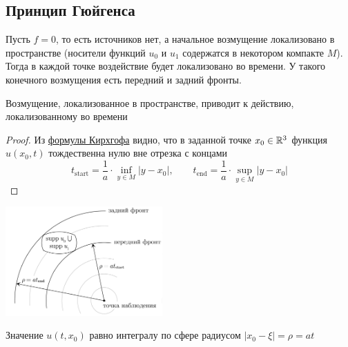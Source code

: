 \documentclass[../main.tex]{subfiles}
\begin{document}
\subsection{Принцип Гюйгенса}

Пусть $f=0$, то есть источников нет, а начальное возмущение локализовано в пространстве (носители функций $u_0$ и $u_1$ содержатся в некотором компакте $M$). Тогда в каждой точке воздействие будет локализовано во времени. У такого конечного возмущения есть передний и задний фронты. 
\begin{statement}
    Возмущение, локализованное в пространстве, приводит к действию, локализованному во времени
\end{statement}

\begin{proof}
Из \hyperref[6_4]{формулы Кирхгофа} видно, что в заданной точке $x_0 \in \mathbb{R}^3$ функция
$u(x_0, t)$ тождественна нулю вне отрезка с концами
$$
t_\text{start} = \frac{1}{a} \cdot \inf_{y\in M}|y-x_0|,
\qquad t_\text{end} = \frac{1}{a} \cdot \sup_{y \in M}|y-x_0|
$$
\end{proof}
\centering
\includegraphics[width=0.45\textwidth]{./pic 6.pdf}

Значение $u(t,x_0)$ равно интегралу по сфере радиусом $|x_0 -\xi| = \rho = at$
\end{document}
